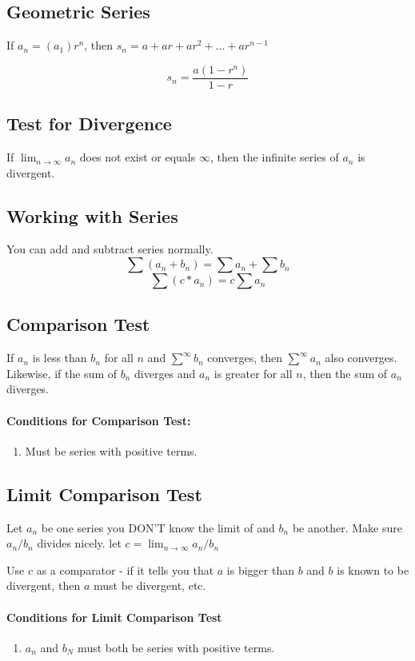 \documentclass[a4paper,12pt]{report}
\begin{document}
\subsection{Geometric Series}
If $a_n = (a_1)r^n$, then $s_n = a + ar + ar^2 + ... + ar^{n-1}$

$$s_n = \frac{a(1-r^n)}{1-r}$$

\subsection{Test for Divergence}
If $\lim_{n \to \infty} a_n$ does not exist or equals $\infty$, then the infinite series of $a_n$ is divergent.

\subsection{Working with Series}
You can add and subtract series normally.
$$\sum (a_n + b_n) = \sum a_n + \sum b_n$$
$$\sum (c * a_n) = c \sum a_n$$

\subsection{Comparison Test}
If $a_n$ is less than $b_n$ for all $n$ and $\sum^{\infty}b_n$ converges, then $\sum^{\infty}a_n$ also converges. Likewise, if the sum of $b_n$ diverges and $a_n$ is greater for all $n$, then the sum of $a_n$ diverges. 

\paragraph{Conditions for Comparison Test: } 
\begin{enumerate}
\item Must be series with positive terms.
\end{enumerate}

\subsection{Limit Comparison Test}
Let $a_n$ be one series you DON'T know the limit of and $b_n$ be another. Make sure $a_n/b_n$ divides nicely. let $c = \lim_{n \to \infty}a_n/b_n$

Use $c$ as a comparator - if it tells you that $a$ is bigger than $b$ and $b$ is known to be divergent, then $a$ must be divergent, etc.

\paragraph{Conditions for Limit Comparison Test}
\begin{enumerate}
\item $a_n$ and $b_N$ must both be series with positive terms.
\end{enumerate}
\end{document}
